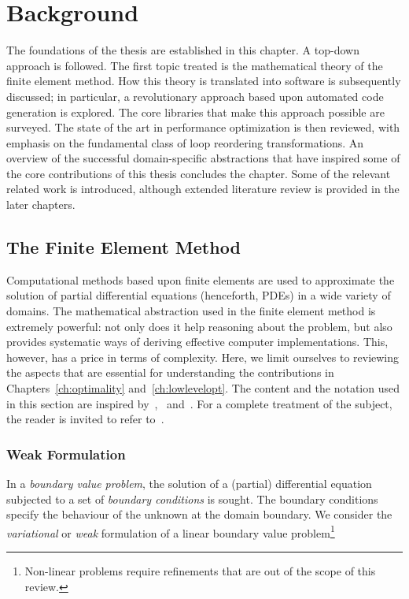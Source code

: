 \chapter{Background}
\label{ch:background}

The foundations of the thesis are established in this chapter. A top-down approach is followed. The first topic treated is the mathematical theory of the finite element method. How this theory is translated into software is subsequently discussed; in particular, a revolutionary approach based upon automated code generation is explored. The core libraries that make this approach possible are surveyed. The state of the art in performance optimization is then reviewed, with emphasis on the fundamental class of loop reordering transformations. An overview of the successful domain-specific abstractions that have inspired some of the core contributions of this thesis concludes the chapter. Some of the relevant related work is introduced, although extended literature review is provided in the later chapters.


\section{The Finite Element Method}
\label{sec:bkg:fem}
Computational methods based upon finite elements are used to approximate the solution of partial differential equations (henceforth, PDEs) in a wide variety of domains. The mathematical abstraction used in the finite element method is extremely powerful: not only does it help reasoning about the problem, but also provides systematic ways of deriving effective computer implementations. This, however, has a price in terms of complexity. Here, we limit ourselves to reviewing the aspects that are essential for understanding the contributions in Chapters~\ref{ch:optimality} and~\ref{ch:lowlevelopt}. The content and the notation used in this section are inspired by~\cite{florian-thesis},~\cite{Fenics} and~\cite{quadrature-olegaard}. For a complete treatment of the subject, the reader is invited to refer to~\cite{brenner-and-scott}.



\subsection{Weak Formulation}
\label{sec:bkg:var-problems}
In a {\em boundary value problem}, the solution of a (partial) differential equation subjected to a set of {\em boundary conditions} is sought. The boundary conditions specify the behaviour of the unknown at the domain boundary. We consider the {\em variational} or {\em weak} formulation of a linear boundary value problem\footnote{Non-linear problems require refinements that are out of the scope of this review.}

